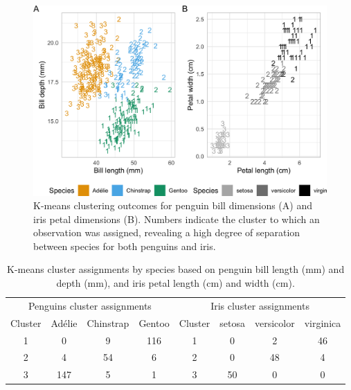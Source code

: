 \begin{Schunk}
\begin{figure}[htbp]

{\centering \includegraphics[width=1\linewidth]{figs/kmeans-1} 

}

\caption[K-means clustering outcomes for penguin bill dimensions (A) and iris petal dimensions (B)]{K-means clustering outcomes for penguin bill dimensions (A) and iris petal dimensions (B). Numbers indicate the cluster to which an observation was assigned, revealing a high degree of separation between species for both penguins and iris.}\label{fig:kmeans}
\end{figure}
\end{Schunk}

\begin{Schunk}
\begin{table}

\caption{\label{tab:unnamed-chunk-1}K-means cluster assignments by species based on penguin bill length (mm) and depth (mm), and iris petal length (cm) and width (cm).}
\centering
\begin{tabular}[t]{cccccccc}
\toprule
\multicolumn{4}{c}{Penguins cluster assignments} & \multicolumn{4}{c}{Iris cluster assignments} \\
\cmidrule(l{3pt}r{3pt}){1-4} \cmidrule(l{3pt}r{3pt}){5-8}
Cluster & Adélie & Chinstrap & Gentoo & Cluster & setosa & versicolor & virginica\\
\midrule
1 & 0 & 9 & 116 & 1 & 0 & 2 & 46\\
2 & 4 & 54 & 6 & 2 & 0 & 48 & 4\\
3 & 147 & 5 & 1 & 3 & 50 & 0 & 0\\
\bottomrule
\end{tabular}
\end{table}

\end{Schunk}

